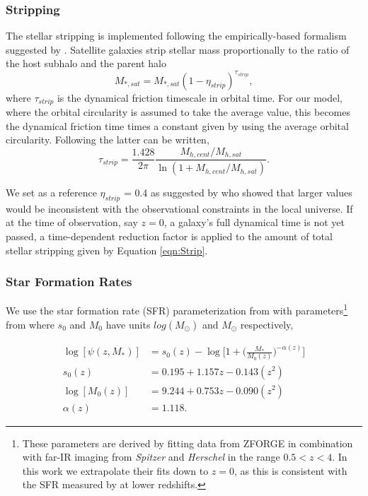 \subsubsection{Stripping}
\label{sec:Stripping}
The stellar stripping is implemented following the empirically-based formalism suggested by \citet{Cattaneo2011HowMass}. Satellite galaxies strip stellar mass proportionally to the ratio of the host subhalo and the parent halo
\begin{equation}
\label{eqn:Strip_Coff}
M_{*,sat} = M_{*,sat}(1-\eta_{strip})^{\tau_{strip}},
\end{equation}
where $\tau_{strip}$ is the dynamical friction timescale in orbital time. For our model, where the orbital circularity is assumed to take the average value, this becomes the dynamical friction time \citep{Chandrasekhar1943DYNAMICALFRICTION} times a constant given by \cite{Jiang2008AClustering} using the average orbital circularity. Following \citet{Cattaneo2011HowMass} the latter can be written,
\begin{equation}
\label{eqn:Strip}
\tau_{strip} = \frac{1.428}{2\pi}\frac{M_{h,cent}/M_{h, sat}}{\ln(1+M_{h,cent}/M_{h,sat})}. 
\end{equation}

We set as a reference $\eta_{strip}$ = 0.4 as suggested by \citet{Cattaneo2011HowMass} who showed that larger values would be inconsistent with the observational constraints in the local universe. If at the time of observation, say $z=0$, a galaxy's full dynamical time is not yet passed, a time-dependent reduction factor is applied to the amount of total stellar stripping given by Equation \ref{eqn:Strip}.

\subsubsection{Star Formation Rates}
We use the star formation rate (SFR) parameterization from \citet{Lee2015A1.3} with parameters\footnote{These parameters are derived by fitting data from ZFORGE in combination with far-IR imaging from \textit{Spitzer} and \textit{Herschel} in the range $0.5<z<4$. In this work we extrapolate their fits down to $z = 0$, as this is consistent with the SFR measured by  \cite{Salim2007UVUniverse} at lower redshifts.} from \citet{Tomczak2016THE4} where $s_0$ and $M_0$ have units $log(M_{\odot})$ and $M_{\odot}$ respectively,

\begin{equation}
\begin{split}
\label{eqn:SFR}
\log[\psi(z, M_*)] &= s_0(z) - \log \Big[ 1 + \Big(\frac{M_*}{M_0(z)}\Big)^{-\alpha(z)}\Big] \\
s_0(z) &= 0.195 + 1.157z - 0.143(z^2) \\
\log[M_0(z)] &= 9.244 + 0.753z - 0.090(z^2) \\
\alpha(z) &= 1.118.
\end{split}
\end{equation}

